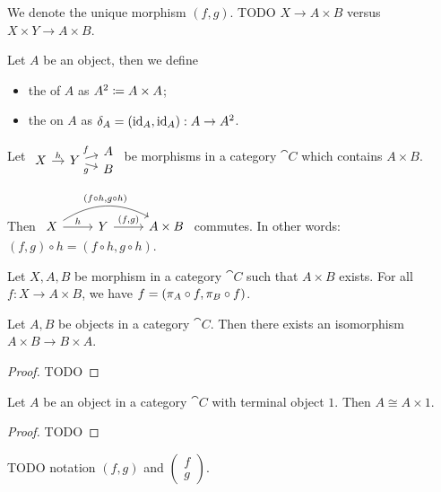 We denote the unique morphism $(f,g)$. TODO $X\to A\times B$ versus $X\times Y \to A\times B$.

\begin{definition}
Let $A$ be an object, then we define
\begin{itemize}
\item the  of $A$ as $A^2 \coloneqq A\times A$;
\item the  on $A$ as $\delta_A = (\operatorname{id}_A, \operatorname{id}_A): A\to A^2$.
\end{itemize}
\end{definition}

\begin{lemma} \label{compositionProjectionMorphisms}
Let $\begin{tikzcd}[row sep=-0.7em, column sep=1em]
&& A \\
X \ar[r, "h"] & Y \ar[ur, "f"] \ar[dr, swap, "g"] & \\
&& B
\end{tikzcd}$ be morphisms in a category $\cat{C}$ which contains $A\times B$.

Then
$\begin{tikzcd}
X \ar[r, "h"] \ar[rr, bend left, "{(f\circ h,g \circ h)}"] & Y \ar[r, "{(f,g)}"] & A\times B
\end{tikzcd}$ commutes.
In other words: $(f,g)\circ h = (f\circ h, g\circ h)$.
\end{lemma}

\begin{lemma} \label{productFactorisationMorphisms}
Let $X,A,B$ be morphism in a category $\cat{C}$ such that $A\times B$ exists. For all $f: X\to A\times B$, we have $f = (\pi_A\circ f, \pi_B\circ f)$.
\end{lemma}

\begin{lemma}
Let $A,B$ be objects in a category $\cat{C}$. Then there exists an isomorphism $A\times B \to B\times A$.
\end{lemma}
\begin{proof}
TODO
\end{proof}

\begin{lemma}
Let $A$ be an object in a category $\cat{C}$ with terminal object $1$. Then $A \cong A\times 1$.
\end{lemma}
\begin{proof}
TODO
\end{proof}

TODO notation $(f,g)$ and $\begin{pmatrix}
f \\ g
\end{pmatrix}$.

